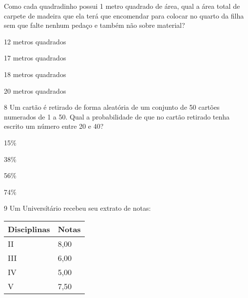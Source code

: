 {%

Como cada quadradinho possui 1 metro quadrado de área, qual a área total
de carpete de madeira que ela terá que encomendar para colocar no quarto
da filha sem que falte nenhum pedaço e também não sobre material?

\begin{escolha}
\item
  12 metros quadrados
\item
  17 metros quadrados
\item
  18 metros quadrados
\item
  20 metros quadrados
\end{escolha}


\num{8} Um cartão é retirado de forma aleatória de um conjunto de 50
cartões numerados de 1 a 50. Qual a probabilidade de que no cartão
retirado tenha escrito um número entre 20 e 40?

\begin{escolha}
\item
  15\%
\item
  38\%
\item
  56\%
\item
  74\%
\end{escolha}


\num{9} Um Universítário recebeu seu extrato de notas:


\begin{longtable}[]{@{}ll@{}}
\toprule
Disciplinas & Notas\tabularnewline
\midrule
\endhead
II & 8,00\tabularnewline
III & 6,00\tabularnewline
IV & 5,00\tabularnewline
V & 7,50\tabularnewline
\bottomrule
\end{longtable}

}
